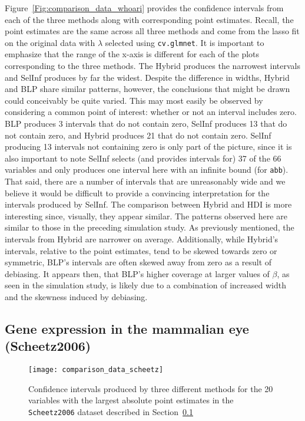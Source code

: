 Figure~\ref{Fig:comparison_data_whoari} provides the confidence intervals from each of the three methods along with corresponding point estimates. Recall, the point estimates are the same across all three methods and come from the lasso fit on the original data with $\lambda$ selected using \texttt{cv.glmnet}. It is important to emphasize that the range of the x-axis is different for each of the plots corresponding to the three methods. The Hybrid produces the narrowest intervals and SelInf produces by far the widest. Despite the difference in widths, Hybrid and BLP share similar patterns, however, the conclusions that might be drawn could conceivably be quite varied. This may most easily be observed by considering a common point of interest: whether or not an interval includes zero. BLP produces 3 intervals that do not contain zero, SelInf produces 13 that do not contain zero, and Hybrid produces 21 that do not contain zero. SelInf producing 13 intervals not containing zero is only part of the picture, since it is also important to note SelInf selects (and provides intervals for) 37 of the 66 variables and only produces one interval here with an infinite bound (for \texttt{abb}). That said, there are a number of intervals that are unreasonably wide and we believe it would be difficult to provide a convincing interpretation for the intervals produced by SelInf. The comparison between Hybrid and HDI is more interesting since, visually, they appear similar. The patterns observed here are similar to those in the preceding simulation study. As previously mentioned, the intervals from Hybrid are narrower on average. Additionally, while Hybrid's intervals, relative to the point estimates, tend to be skewed towards zero or symmetric, BLP's intervals are often skewed away from zero as a result of debiasing. It appears then, that BLP's higher coverage at larger values of $\beta$, as seen in the simulation study, is likely due to a combination of increased width and the skewness induced by debiasing.

\subsection{Gene expression in the mammalian eye (Scheetz2006)}\label{Sec:Scheetz2006}

\begin{figure}[hbtp]
  \begin{center}
  \texttt{[image: comparison\_data\_scheetz]}
  \caption{\label{Fig:comparison_data_scheetz} Confidence intervals produced by three different methods for the 20 variables with the largest absolute point estimates in the \texttt{Scheetz2006} dataset described in Section~\ref{Sec:Scheetz2006}}
  \end{center}
\end{figure}


